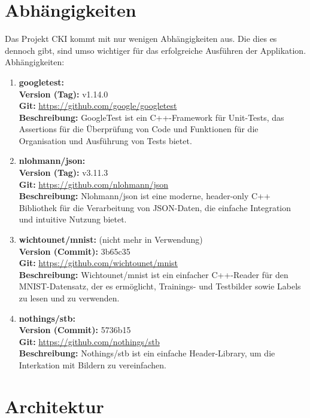 \section{Abhängigkeiten}
\label{sec:RealAbhängigkeiten}
Das Projekt CKI kommt mit nur wenigen Abhängigkeiten aus.
Die dies es dennoch gibt, sind umso wichtiger für das erfolgreiche Ausführen der Applikation.
\\
Abhängigkeiten:
\begin{enumerate}
	\item \textbf{googletest:} \\
	\textbf{Version (Tag):} v1.14.0 \\
	\textbf{Git:} \url{https://github.com/google/googletest} \\
	\textbf{Beschreibung:} GoogleTest ist ein C++-Framework für Unit-Tests, das Assertions für die Überprüfung von Code und Funktionen für die Organisation und Ausführung von Tests bietet.

	\item \textbf{nlohmann/json:} \\
	\textbf{Version (Tag):} v3.11.3 \\
	\textbf{Git:} \url{https://github.com/nlohmann/json} \\
	\textbf{Beschreibung:} Nlohmann/json ist eine moderne, header-only C++ Bibliothek für die Verarbeitung von JSON-Daten, die einfache Integration und intuitive Nutzung bietet.

	\item \textbf{wichtounet/mnist:} (nicht mehr in Verwendung)\\
	\textbf{Version (Commit):} 3b65c35 \\
	\textbf{Git:} \url{https://github.com/wichtounet/mnist} \\
	\textbf{Beschreibung:} Wichtounet/mnist ist ein einfacher C++-Reader für den MNIST-Datensatz, der es ermöglicht, Trainings- und Testbilder sowie Labels zu lesen und zu verwenden.

	\item \textbf{nothings/stb:}\\
	\textbf{Version (Commit):} 5736b15 \\
	\textbf{Git:} \url{https://github.com/nothings/stb} \\
	\textbf{Beschreibung:} Nothings/stb ist ein einfache Header-Library, um die Interkation mit Bildern zu vereinfachen.
\end{enumerate}

\section{Architektur}
\label{sec:RealArchitektur}
